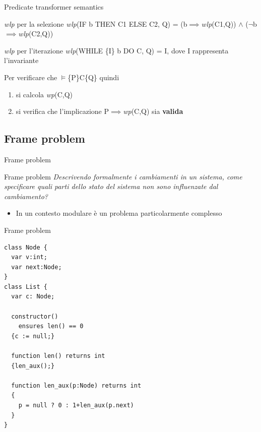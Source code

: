 \documentclass[]{beamer}
\begin{document}
\begin{frame}[t]{Predicate transformer semantics}
\begin{center}    
    \begin{block}{\textit{wlp} per la selezione}
        \textit{wlp}(IF b THEN C1 ELSE C2, Q) = (b$\implies$\textit{wlp}(C1,Q)) $\land$ ($\neg$b$\implies$\textit{wlp}(C2,Q))
    \end{block}
    \begin{block}{\textit{wlp} per l'iterazione}
        \textit{wlp}(WHILE \{I\} b DO C, Q) = I, dove I rappresenta l'invariante
    \end{block}
\end{center}
Per verificare che $\models$\{P\}C\{Q\} quindi
\begin{enumerate}
    \item si calcola \textit{wp}(C,Q)
    \item si verifica che l'implicazione P$\implies$\textit{wp}(C,Q) sia \textbf{valida}
\end{enumerate}
\end{frame}
\subsection{Frame problem}
\begin{frame}{Frame problem}
\begin{block}{Frame problem}
    \textit{Descrivendo formalmente i cambiamenti in un sistema, come specificare quali parti dello stato del sistema non sono influenzate dal cambiamento?}
\end{block}
\begin{itemize}
    \item In un contesto modulare è un problema particolarmente complesso
\end{itemize}
\end{frame}

\begin{frame}[containsverbatim]{Frame problem}
\lstset{linewidth=11cm}
\begin{lstlisting}
class Node {
  var v:int;
  var next:Node;
}
class List {
  var c: Node;
  
  constructor()
    ensures len() == 0
  {c := null;}
  
  function len() returns int 
  {len_aux();}
  
  function len_aux(p:Node) returns int
  {
    p = null ? 0 : 1+len_aux(p.next)
  }
}\end{lstlisting}
\end{frame}
\end{document}
